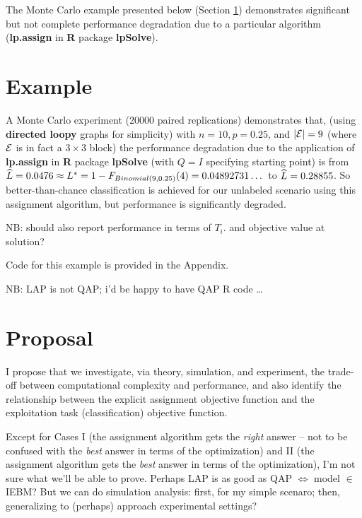 The Monte Carlo example presented below (Section \ref{Example})
demonstrates significant but not complete performance degradation
due to a particular algorithm
({\bf lp.assign} in {\bf R} package {\bf lpSolve}).




\section{Example}\label{Example}

A Monte Carlo experiment (20000 paired replications) demonstrates that,
(using {\bf directed loopy} graphs for simplicity)
with $n=10, p=0.25$, and $|\mathcal{E}|=9$
(where $\mathcal{E}$ is in fact a $3 \times 3$ block)
the performance degradation due to the application of
{\bf lp.assign} in {\bf R} package {\bf lpSolve}
(with $Q=I$ specifying starting point)
is from
$\widehat{L} = 0.0476 \approx L^* = 1-F_{Binomial(9,0.25)}(4) = 0.04892731\dots$
to
 $\widehat{L} = 0.28855$.
So better-than-chance classification is achieved for our unlabeled scenario
using this assignment algorithm,
but performance is significantly degraded.

NB:
should also report performance in terms of $T_i$.
and objective value at solution?

Code for this example is provided in the Appendix.

NB: LAP is not QAP; i'd be happy to have QAP R code \dots

\section{Proposal}

I propose that we investigate,
via theory, simulation, and experiment,
the trade-off between computational complexity and performance,
and also identify the relationship between
the explicit assignment objective function
and the exploitation task (classification) objective function.

Except for Cases
I
(the assignment algorithm gets the {\em right} answer --
not to be confused with the {\em best} answer in terms of the optimization)
and
II
(the assignment algorithm gets the {\em best} answer in terms of the optimization),
I'm not sure what we'll be able to prove.
Perhaps
\thma
LAP is as good as QAP $\iff$ model $\in$ IEBM?
\thmb
But we can do simulation analysis:
first, for my simple scenaro;
then, generalizing to (perhaps) approach experimental settings?
\\

